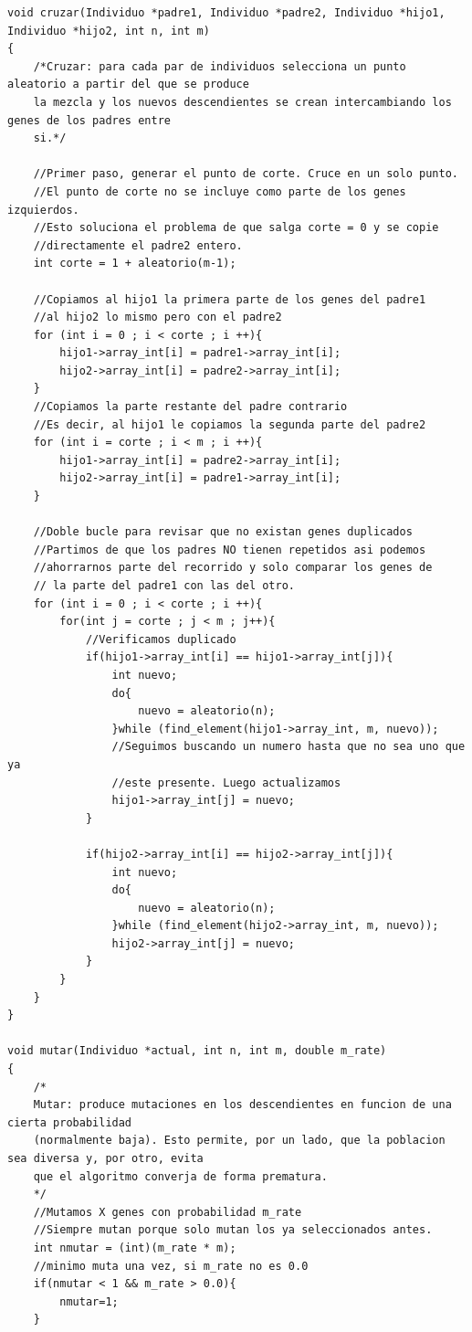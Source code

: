 \documentclass[12pt]{article}
\begin{document}
\begin{lstlisting}[style=EstiloC]
void cruzar(Individuo *padre1, Individuo *padre2, Individuo *hijo1, Individuo *hijo2, int n, int m)
{
    /*Cruzar: para cada par de individuos selecciona un punto aleatorio a partir del que se produce
    la mezcla y los nuevos descendientes se crean intercambiando los genes de los padres entre
    si.*/

    //Primer paso, generar el punto de corte. Cruce en un solo punto.
    //El punto de corte no se incluye como parte de los genes izquierdos.
    //Esto soluciona el problema de que salga corte = 0 y se copie
    //directamente el padre2 entero.
    int corte = 1 + aleatorio(m-1);

    //Copiamos al hijo1 la primera parte de los genes del padre1
    //al hijo2 lo mismo pero con el padre2
    for (int i = 0 ; i < corte ; i ++){
        hijo1->array_int[i] = padre1->array_int[i];
        hijo2->array_int[i] = padre2->array_int[i];
    }
    //Copiamos la parte restante del padre contrario
    //Es decir, al hijo1 le copiamos la segunda parte del padre2
    for (int i = corte ; i < m ; i ++){
        hijo1->array_int[i] = padre2->array_int[i];
        hijo2->array_int[i] = padre1->array_int[i];
    }

    //Doble bucle para revisar que no existan genes duplicados
    //Partimos de que los padres NO tienen repetidos asi podemos
    //ahorrarnos parte del recorrido y solo comparar los genes de
    // la parte del padre1 con las del otro.
    for (int i = 0 ; i < corte ; i ++){
        for(int j = corte ; j < m ; j++){
            //Verificamos duplicado
            if(hijo1->array_int[i] == hijo1->array_int[j]){
                int nuevo;
                do{
                    nuevo = aleatorio(n);
                }while (find_element(hijo1->array_int, m, nuevo));
                //Seguimos buscando un numero hasta que no sea uno que ya
                //este presente. Luego actualizamos
                hijo1->array_int[j] = nuevo;
            }

            if(hijo2->array_int[i] == hijo2->array_int[j]){
                int nuevo;
                do{
                    nuevo = aleatorio(n);
                }while (find_element(hijo2->array_int, m, nuevo));
                hijo2->array_int[j] = nuevo;
            }
        }
    }
}

void mutar(Individuo *actual, int n, int m, double m_rate)
{
    /*
    Mutar: produce mutaciones en los descendientes en funcion de una cierta probabilidad
    (normalmente baja). Esto permite, por un lado, que la poblacion sea diversa y, por otro, evita
    que el algoritmo converja de forma prematura.
    */
    //Mutamos X genes con probabilidad m_rate
    //Siempre mutan porque solo mutan los ya seleccionados antes.
    int nmutar = (int)(m_rate * m);
    //minimo muta una vez, si m_rate no es 0.0
    if(nmutar < 1 && m_rate > 0.0){
        nmutar=1;
    }


\end{lstlisting}
\end{document}

